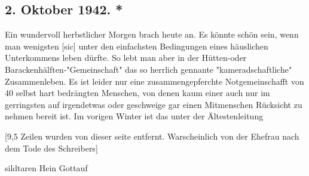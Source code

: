 \subsection{2. Oktober 1942. *}

Ein wundervoll herbstlicher Morgen brach heute an.
Es k\"{o}nnte sch\"{o}n sein, wenn man wenigsten{\color{red} [sic] } unter den einfachsten Bedingungen eines h\"{a}uslichen Unterkommens leben d\"{u}rfte.
So lebt man aber in der H\"{u}tten-oder Barackenh\"{a}lften-"Gemeinschaft" das so herrlich gennante "kameradschaftliche" Zusammenleben.
Es ist leider nur eine zusammengepferchte Notgemeinschafft von 40 selbst hart bedr\"{a}ngten Menschen, von denen kaum einer auch nur im gerringsten auf irgendetwas oder geschweige gar einen Mitmenschen R\"{u}cksicht zu nehmen bereit ist.
Im vorigen Winter ist das unter der \"{A}ltestenleitung

{\color{red} [9,5 Zeilen wurden von dieser seite entfernt. Warscheinlich von der Ehefrau nach dem Tode des Schreibers] }

sildtaren Hein Gottauf

\clearpage
